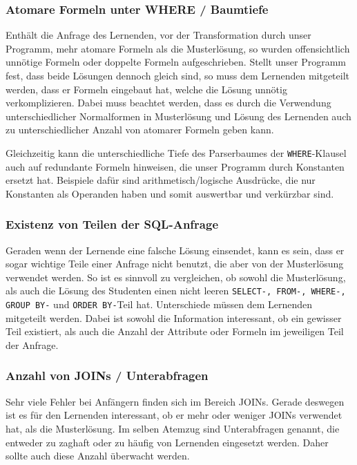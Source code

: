 \subsubsection*{Atomare Formeln unter WHERE / Baumtiefe}

Enthält die Anfrage des Lernenden, vor der Transformation durch unser Programm, mehr atomare Formeln als die Musterlösung, so wurden offensichtlich unnötige Formeln oder doppelte Formeln aufgeschrieben. Stellt unser Programm fest, dass beide Lösungen dennoch gleich sind, so muss dem Lernenden mitgeteilt werden, dass er Formeln eingebaut hat, welche die Lösung unnötig verkomplizieren. Dabei muss beachtet werden, dass es durch die Verwendung unterschiedlicher Normalformen in Musterlösung und Lösung des Lernenden auch zu unterschiedlicher Anzahl von atomarer Formeln geben kann.

Gleichzeitig kann die unterschiedliche Tiefe des Parserbaumes der \verb|WHERE|-Klausel auch auf redundante Formeln hinweisen, die unser Programm durch Konstanten ersetzt hat. Beispiele dafür sind arithmetisch/logische Ausdrücke, die nur Konstanten als Operanden haben und somit auswertbar und verkürzbar sind.

\subsubsection*{Existenz von Teilen der SQL-Anfrage}

Geraden wenn der Lernende eine falsche Lösung einsendet, kann es sein, dass er sogar wichtige Teile einer Anfrage nicht benutzt, die aber von der Musterlösung verwendet werden. So ist es sinnvoll zu vergleichen, ob sowohl die Musterlösung, als auch die Lösung des Studenten einen nicht leeren \verb|SELECT-, FROM-, WHERE-, GROUP BY-| und \verb|ORDER BY-|Teil hat. Unterschiede müssen dem Lernenden mitgeteilt werden. Dabei ist sowohl die Information interessant, ob ein gewisser Teil existiert, als auch die Anzahl der Attribute oder Formeln im jeweiligen Teil der Anfrage.

\subsubsection*{Anzahl von JOINs / Unterabfragen}

Sehr viele Fehler bei Anfängern finden sich im Bereich JOINs. Gerade deswegen ist es für den Lernenden interessant, ob er mehr oder weniger JOINs verwendet hat, als die Musterlösung. Im selben Atemzug sind Unterabfragen genannt, die entweder zu zaghaft oder zu häufig von Lernenden eingesetzt werden. Daher sollte auch diese Anzahl überwacht werden.

